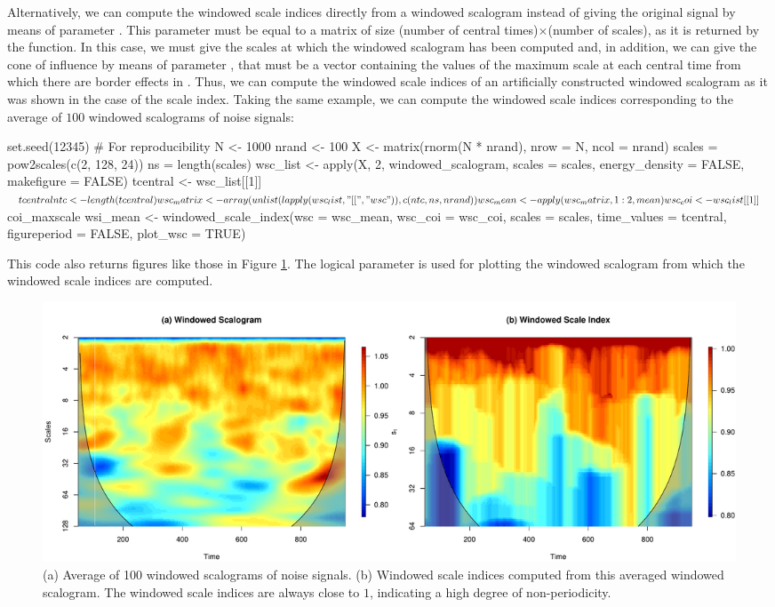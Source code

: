Alternatively, we can compute the windowed scale indices directly from a windowed scalogram instead of giving the original signal by means of parameter . This parameter must be equal to a matrix of size (number of central times)$\times$(number of scales), as it is returned by the  function. In this case, we must give the scales at which the windowed scalogram  has been computed and, in addition, we can give the cone of influence by means of parameter , that must be a vector containing the values of the maximum scale at each central time from which there are border effects in . Thus, we can compute the windowed scale indices of an artificially constructed windowed scalogram as it was shown in the case of the scale index. Taking the same example, we can compute the windowed scale indices corresponding to the average of $100$ windowed scalograms of noise signals:
\begin{example}
set.seed(12345) # For reproducibility
N <- 1000
nrand <- 100
X <- matrix(rnorm(N * nrand), nrow = N, ncol = nrand)
scales = pow2scales(c(2, 128, 24))
ns = length(scales)
wsc_list <- apply(X, 2, windowed_scalogram, scales = scales,
                  energy_density = FALSE, makefigure = FALSE)
tcentral <- wsc_list[[1]]$tcentral
ntc <- length(tcentral)
wsc_matrix <- array(unlist(lapply(wsc_list, "[[", "wsc")), c(ntc, ns, nrand))
wsc_mean <- apply(wsc_matrix, 1:2, mean)
wsc_coi <- wsc_list[[1]]$coi_maxscale
wsi_mean <- windowed_scale_index(wsc = wsc_mean, wsc_coi = wsc_coi,
                                 scales = scales, time_values = tcentral,
                                 figureperiod = FALSE, plot_wsc = TRUE)
\end{example}
This code also returns figures like those in Figure \ref{fig:wsi_prng}. The logical parameter  is used for plotting the windowed scalogram from which the windowed scale indices are computed.

\begin{figure}[tbp]
\begin{center}
  \includegraphics[width=\textwidth]{Figure12}
\end{center}
\caption{(a) Average of 100 windowed scalograms of noise signals. (b) Windowed scale indices computed from this averaged windowed scalogram. The windowed scale indices are always close to $1$, indicating a high degree of non-periodicity.}
\label{fig:wsi_prng}
\end{figure}

